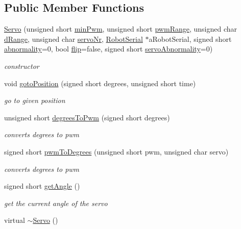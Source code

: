 \subsection*{Public Member Functions}
\begin{DoxyCompactItemize}
\item 
\hyperlink{struct_servo_abaa283d5f6f293cf1149ac9072e579c7}{Servo} (unsigned short \hyperlink{struct_servo_a209ccc691c719c1442f77a0c0ee08fbb}{min\+Pwm}, unsigned short \hyperlink{struct_servo_ad3b5b2cb998a334baeb520cecc24be48}{pwm\+Range}, unsigned char \hyperlink{struct_servo_a534d23b4cf1dcdd677dfa503101c50a0}{d\+Range}, unsigned char \hyperlink{struct_servo_a0795bd3f3c8d44e1818ffd653a7484d5}{servo\+Nr}, \hyperlink{class_robot_serial}{Robot\+Serial} $\ast$a\+Robot\+Serial, signed short \hyperlink{struct_servo_a65a5e86b2f31ec2a9c115e818a1ea703}{abnormality}=0, bool \hyperlink{struct_servo_a4b94c914128a9965e264f0be608fb6a7}{flip}=false, signed short \hyperlink{struct_servo_a0876d7d53f6e32cd75fa8ead3c274ead}{servo\+Abnormality}=0)
\begin{DoxyCompactList}\small\item\em constructor \end{DoxyCompactList}\item 
void \hyperlink{struct_servo_aed94c74351c407e550a51ba40215c135}{goto\+Position} (signed short degrees, unsigned short time)
\begin{DoxyCompactList}\small\item\em go to given position \end{DoxyCompactList}\item 
unsigned short \hyperlink{struct_servo_a83fca556e9f1749257a9691f0e5036a9}{degrees\+To\+Pwm} (signed short degrees)
\begin{DoxyCompactList}\small\item\em converts degrees to pwm \end{DoxyCompactList}\item 
signed short \hyperlink{struct_servo_a293b3a36b2ab449f83d2c1152a6c5115}{pwm\+To\+Degrees} (unsigned short pwm, unsigned char servo)
\begin{DoxyCompactList}\small\item\em converts degrees to pwm \end{DoxyCompactList}\item 
signed short \hyperlink{struct_servo_af8a34733daf26ac3fe4bc6002931b7a8}{get\+Angle} ()
\begin{DoxyCompactList}\small\item\em get the current angle of the servo \end{DoxyCompactList}\item 
virtual \hyperlink{struct_servo_acb51bf4d970b071741ba76349a431fb0}{$\sim$\+Servo} ()
\end{DoxyCompactItemize}
